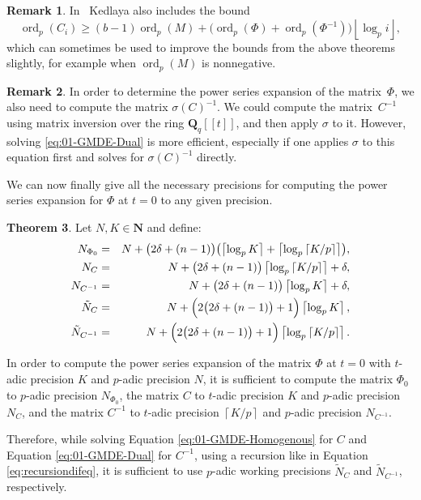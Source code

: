 \documentclass[a4paper,11pt]{article}
\numberwithin{equation}{section}
\providecommand{\floor}[1]{\left\lfloor#1\right\rfloor}   %
\providecommand{\ceil}[1]{\left\lceil#1\right\rceil}   %
\newcommand{\NN}{\mathbf{N}} %
\newcommand{\QQ}{\mathbf{Q}} %
\DeclareMathOperator{\ord}{ord}          %
\theoremstyle{definition}
\newtheorem{thm}{Theorem}[section]
\newtheorem{rem}[thm]{Remark}
\begin{document}
\begin{rem}
In~\citep[Remark~18.3.4]{Kedlaya2010} Kedlaya also includes the bound
\begin{equation*}
\ord_p(C_i) \geq (b - 1) \ord_p(M) 
            + \bigl( \ord_p(\Phi) + \ord_p(\Phi^{-1}) \bigr) \floor{\log_p i},
\end{equation*}
which can sometimes be used to improve the bounds from the above theorems 
slightly, for example when $\ord_p(M)$ is nonnegative.
\end{rem}

\begin{rem} \label{rem:sigmatrick}
In order to determine the power series expansion of the matrix~$\Phi$, 
we also need to compute the matrix $\sigma(C)^{-1}$. We could compute 
the matrix~$C^{-1}$ using matrix inversion over the ring $\mathbf{Q}_q[[t]]$,
and then apply $\sigma$ to it. However, solving \eqref{eq:01-GMDE-Dual} is 
more efficient, especially if one applies $\sigma$ to this equation first 
and solves for $\sigma(C)^{-1}$ directly.
\end{rem}

We can now finally give all the necessary precisions for computing the power 
series expansion for $\Phi$ at $t=0$ to any given precision.

\begin{thm} \label{thm:Ni}
Let $N,K \in \NN$ and define:
\begin{eqnarray*}
N_{\Phi_0}   		&=& N+\bigl(2\delta+(n-1)\bigr) \bigl(\ceil{\log_p K} + \ceil{\log_p \ceil{K/p}}\bigr),\\
N_{C}				&=& N+\bigl(2\delta+(n-1)\bigr) \ceil{\log_p \ceil{K/p}} + \delta, \\
N_{C^{-1}}			&=& N+\bigl(2\delta+(n-1)\bigr) \ceil{\log_p K} + \delta, \\
\tilde{N}_C			&=& N+\Bigl(2 \bigl(2 \delta + (n-1)\bigr) + 1\Bigr) \ceil{\log_p K}, \\
\tilde{N}_{C^{-1}}	&=& N+\Bigl(2 \bigl(2 \delta + (n-1)\bigr) + 1\Bigr) \ceil{\log_p \ceil{K/p}}.
\end{eqnarray*}

In order to compute the power series expansion 
of the matrix $\Phi$ at $t=0$ with $t$-adic precision $K$ and $p$-adic precision $N$, 
it is sufficient to compute
the matrix $\Phi_0$ to $p$-adic precision $N_{\Phi_0}$,
the matrix $C$ to $t$-adic precision $K$ and $p$-adic precision $N_{C}$, and
the matrix $C^{-1}$ to $t$-adic precision $\ceil{K/p}$ and $p$-adic precision 
$N_{C^{-1}}$.

Therefore, while solving Equation \eqref{eq:01-GMDE-Homogenous} for $C$ and 
Equation \eqref{eq:01-GMDE-Dual} for $C^{-1}$, using a recursion like in 
Equation \eqref{eq:recursiondifeq}, it is sufficient to use $p$-adic 
working precisions $\tilde{N}_C$ and $\tilde{N}_{C^{-1}}$, respectively.
\end{thm}
\end{document}
